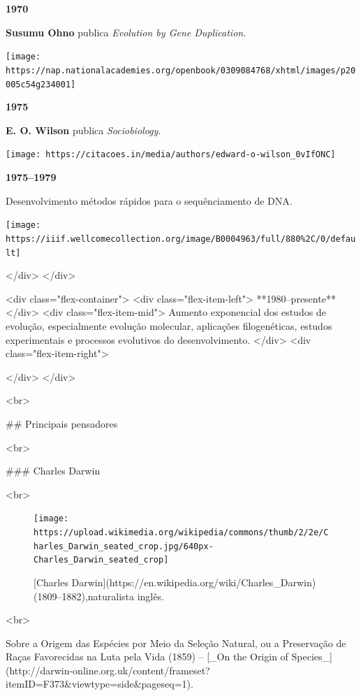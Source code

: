 \documentclass[
]{book}
\begin{document}
\textbf{1970}

\textbf{Susumu Ohno} publica \emph{Evolution by Gene Duplication}.

\begin{flushleft}\texttt{[image: https://nap.nationalacademies.org/openbook/0309084768/xhtml/images/p20005c54g234001]} \end{flushleft}

\textbf{1975}

\textbf{E. O. Wilson} publica \emph{Sociobiology}.

\begin{flushleft}\texttt{[image: https://citacoes.in/media/authors/edward-o-wilson\_0vIfONC]} \end{flushleft}

\textbf{1975--1979}

Desenvolvimento métodos rápidos para o sequênciamento de DNA.

\begin{flushleft}\texttt{[image: https://iiif.wellcomecollection.org/image/B0004963/full/880\%2C/0/default]} \end{flushleft}
  </div>
</div>

<div class="flex-container">
  <div class="flex-item-left">
  **1980--presente**
  </div>
  <div class="flex-item-mid">
  Aumento exponencial dos estudos de evolução, especialmente evolução molecular, aplicações filogenéticas, estudos experimentais e processos evolutivos do  desenvolvimento.
  </div>
  <div class="flex-item-right">
 
  </div>
</div>

<br> 

## Principais pensadores

<br> 

### Charles Darwin

<br>

\begin{figure}

\hfill{}\texttt{[image: https://upload.wikimedia.org/wikipedia/commons/thumb/2/2e/Charles\_Darwin\_seated\_crop.jpg/640px-Charles\_Darwin\_seated\_crop]} 

\caption{[Charles Darwin](https://en.wikipedia.org/wiki/Charles_Darwin) (1809--1882),naturalista inglês.}\label{fig:darwin}
\end{figure}

<br>

Sobre a Origem das Espécies por Meio da Seleção Natural, ou a Preservação de Raças Favorecidas na Luta pela Vida (1859) -- [_On the Origin of Species_](http://darwin-online.org.uk/content/frameset?itemID=F373&viewtype=side&pageseq=1).
\end{document}
